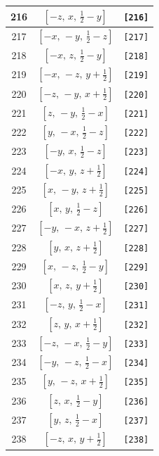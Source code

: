 \documentclass[fleqn,8pt]{jsarticle}
\begin{document}
\begin{longtable}{ccc}
216 & $\left[ - z,\, x,\, \frac{1}{2} - y \right]$ & {\tt [216]} \\ \hline
217 & $\left[ - x,\, - y,\, \frac{1}{2} - z \right]$ & {\tt [217]} \\ \hline
218 & $\left[ - x,\, z,\, \frac{1}{2} - y \right]$ & {\tt [218]} \\ \hline
219 & $\left[ - x,\, - z,\, y + \frac{1}{2} \right]$ & {\tt [219]} \\ \hline
220 & $\left[ - z,\, - y,\, x + \frac{1}{2} \right]$ & {\tt [220]} \\ \hline
221 & $\left[ z,\, - y,\, \frac{1}{2} - x \right]$ & {\tt [221]} \\ \hline
222 & $\left[ y,\, - x,\, \frac{1}{2} - z \right]$ & {\tt [222]} \\ \hline
223 & $\left[ - y,\, x,\, \frac{1}{2} - z \right]$ & {\tt [223]} \\ \hline
224 & $\left[ - x,\, y,\, z + \frac{1}{2} \right]$ & {\tt [224]} \\ \hline
225 & $\left[ x,\, - y,\, z + \frac{1}{2} \right]$ & {\tt [225]} \\ \hline
226 & $\left[ x,\, y,\, \frac{1}{2} - z \right]$ & {\tt [226]} \\ \hline
227 & $\left[ - y,\, - x,\, z + \frac{1}{2} \right]$ & {\tt [227]} \\ \hline
228 & $\left[ y,\, x,\, z + \frac{1}{2} \right]$ & {\tt [228]} \\ \hline
229 & $\left[ x,\, - z,\, \frac{1}{2} - y \right]$ & {\tt [229]} \\ \hline
230 & $\left[ x,\, z,\, y + \frac{1}{2} \right]$ & {\tt [230]} \\ \hline
231 & $\left[ - z,\, y,\, \frac{1}{2} - x \right]$ & {\tt [231]} \\ \hline
232 & $\left[ z,\, y,\, x + \frac{1}{2} \right]$ & {\tt [232]} \\ \hline
233 & $\left[ - z,\, - x,\, \frac{1}{2} - y \right]$ & {\tt [233]} \\ \hline
234 & $\left[ - y,\, - z,\, \frac{1}{2} - x \right]$ & {\tt [234]} \\ \hline
235 & $\left[ y,\, - z,\, x + \frac{1}{2} \right]$ & {\tt [235]} \\ \hline
236 & $\left[ z,\, x,\, \frac{1}{2} - y \right]$ & {\tt [236]} \\ \hline
237 & $\left[ y,\, z,\, \frac{1}{2} - x \right]$ & {\tt [237]} \\ \hline
238 & $\left[ - z,\, x,\, y + \frac{1}{2} \right]$ & {\tt [238]} \\ \hline

\end{longtable}
\end{document}
